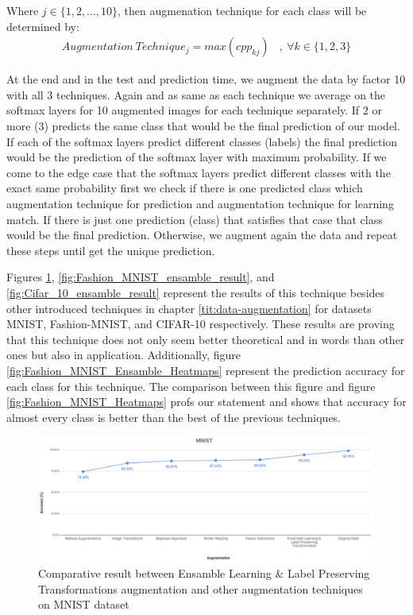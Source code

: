 Where $j \in \{1,2,...,10\}$, then augmenation technique for each class will be determined by:
\begin{equation}
  \begin{aligned}
    Augmentation \ Technique_{j} = max(cpp_{kj}) \ \ \ \ , \ \forall k \in \{1,2,3\}
  \end{aligned}
\end{equation}

At the end and in the test and prediction time, we augment the data by factor 10 with all 3
techniques. Again and as same as each technique we average on the softmax layers for 10 augmented
images for each technique separately. If $2$ or more ($3$) predicts the same class that would be the
final prediction of our model. If each of the softmax layers predict different classes (labels) the
final prediction would be the prediction of the softmax layer with maximum probability.  If we come
to the edge case that the softmax layers predict different classes with the exact same probability
first we check if there is one predicted class which augmentation technique for prediction and
augmentation technique for learning match. If there is just one prediction (class) that satisfies
that case that class would be the final prediction. Otherwise, we augment again the data and repeat
these steps until get the unique prediction. 

Figures \ref{fig:MNIST_ensamble_result}, \ref{fig:Fashion_MNIST_ensamble_result}, and \ref{fig:Cifar_10_ensamble_result} represent the results of this technique besides other introduced techniques in
chapter \ref{tit:data-augmentation} for datasets MNIST, Fashion-MNIST, and CIFAR-10 respectively. These results are
proving that this technique does not only seem better theoretical and in words than other ones but
also in application. Additionally, figure \ref{fig:Fashion_MNIST_Ensamble_Heatmaps} represent the
prediction accuracy for each class for this technique. The comparison between this figure and figure
\ref{fig:Fashion_MNIST_Heatmaps} profs our statement and shows that accuracy for almost every class is better than the best of the previous techniques. 

\begin{figure}
  \centering
  \label{fig:MNIST_ensamble_result}
  \includegraphics[width=1\textwidth]{fig/contribution/mnist-ensamble-result}
  \caption{Comparative result between Ensamble Learning \& Label Preserving Transformations augmentation and other augmentation techniques on MNIST dataset}
\end{figure}


